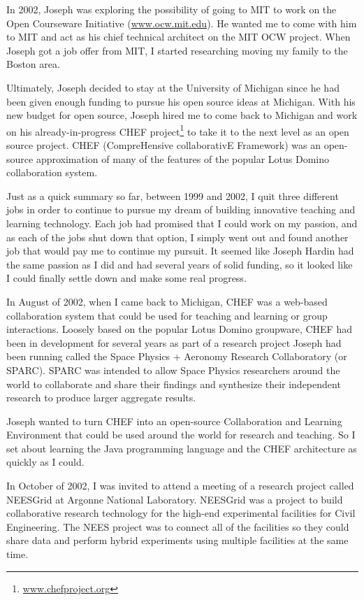 \documentclass[12pt]{book}
\begin{document}
In 2002, Joseph was exploring the possibility of going to MIT to work on the
Open Courseware Initiative (\url{www.ocw.mit.edu}).  He wanted me to
come with him to MIT and act as his chief technical architect on
the MIT OCW project.  When Joseph got a job offer from MIT, I started
researching moving my family to the Boston area.

Ultimately, Joseph decided to stay at the University of Michigan
since he had been given enough funding to pursue his
open source ideas at Michigan.  With his new budget for open source,
Joseph hired me to come back to Michigan
and work on his already-in-progress CHEF project\footnote{\url{www.chefproject.org}}
to take it to the next level as an open source project.
CHEF (CompreHensive collaborativE Framework)
was an open-source approximation of many of the features of
the popular Lotus Domino collaboration system.

Just as a quick summary so far, between 1999 and 2002,
I quit three different jobs in order to continue to
pursue my dream of building innovative teaching and learning
technology.  Each job had promised that I could work
on my passion, and as each of the jobs shut down that
option, I simply went out and found another
job that would pay me to continue my pursuit.  It seemed like
Joseph Hardin had the same passion as I did and had several
years of solid funding, so it looked like I could finally
settle down and make some real progress.

In August of 2002, when I came back to Michigan, CHEF was a web-based
collaboration system that could be used for teaching and learning
or group interactions.  Loosely based
on the popular Lotus Domino groupware,
CHEF had been in development for several years as part of
a research project Joseph had been running called the
Space Physics + Aeronomy Research Collaboratory (or SPARC).
SPARC was intended to allow Space Physics researchers around the
world to collaborate and share their findings and synthesize their
independent research to produce larger aggregate results.

Joseph wanted to turn CHEF into an open-source Collaboration and
Learning Environment that could be used around the world for research
and teaching.  So I set about learning the Java programming language
and the CHEF architecture as quickly as I could.

In October of 2002, I was invited to attend a meeting of a research
project called NEESGrid at Argonne National Laboratory.  NEESGrid
was a project to build collaborative
research technology for the high-end experimental facilities for Civil
Engineering.  The NEES project was to connect all of the facilities
so they could share data and perform hybrid experiments using multiple
facilities at the same time.
\end{document}
